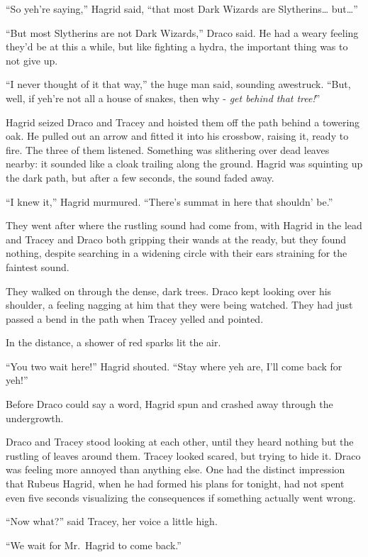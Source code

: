 ``So yeh're saying,'' Hagrid said, ``that most Dark Wizards are
Slytherins\ldots{} but\ldots{}''

``But most Slytherins are not Dark Wizards,'' Draco said. He had a weary
feeling they'd be at this a while, but like fighting a hydra, the
important thing was to not give up.

``I never thought of it that way,'' the huge man said, sounding
awestruck. ``But, well, if yeh're not all a house of snakes, then why -
\emph{get behind that tree!}''

Hagrid seized Draco and Tracey and hoisted them off the path behind a
towering oak. He pulled out an arrow and fitted it into his crossbow,
raising it, ready to fire. The three of them listened. Something was
slithering over dead leaves nearby: it sounded like a cloak trailing
along the ground. Hagrid was squinting up the dark path, but after a few
seconds, the sound faded away.

``I knew it,'' Hagrid murmured. ``There's summat in here that shouldn'
be.''

They went after where the rustling sound had come from, with Hagrid in
the lead and Tracey and Draco both gripping their wands at the ready,
but they found nothing, despite searching in a widening circle with
their ears straining for the faintest sound.

They walked on through the dense, dark trees. Draco kept looking over
his shoulder, a feeling nagging at him that they were being watched.
They had just passed a bend in the path when Tracey yelled and pointed.

In the distance, a shower of red sparks lit the air.

``You two wait here!'' Hagrid shouted. ``Stay where yeh are, I'll come
back for yeh!''

Before Draco could say a word, Hagrid spun and crashed away through the
undergrowth.

Draco and Tracey stood looking at each other, until they heard nothing
but the rustling of leaves around them. Tracey looked scared, but trying
to hide it. Draco was feeling more annoyed than anything else. One had
the distinct impression that Rubeus Hagrid, when he had formed his plans
for tonight, had not spent even five seconds visualizing the
consequences if something actually went wrong.

``Now what?'' said Tracey, her voice a little high.

``We wait for Mr.~Hagrid to come back.''


